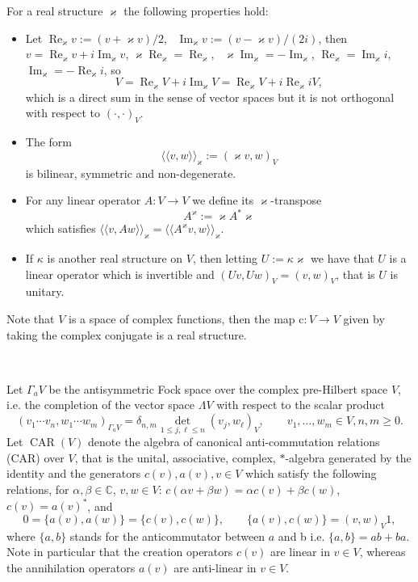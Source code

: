 \documentclass{article}
\newcommand{\assign}{:=}
\newcommand{\cdummy}{\cdot}
\newcommand{\llangle}{{\langle\!\langle}}
\newcommand{\rrangle}{{\rangle\!\rangle}}
\newcommand{\tmop}[1]{\ensuremath{\operatorname{#1}}}
\newenvironment{itemizedot}{\begin{itemize} \renewcommand{\labelitemi}{$\bullet$}\renewcommand{\labelitemii}{$\bullet$}\renewcommand{\labelitemiii}{$\bullet$}\renewcommand{\labelitemiv}{$\bullet$}}{\end{itemize}}
\begin{document}
For a real structure $\varkappa$ the following properties hold:
\begin{itemizedot}
  \item Let $\tmop{Re}_{\varkappa} v \assign (v + \varkappa v) / 2$, \
  $\tmop{Im}_{\varkappa} v \assign (v - \varkappa v) / (2 i)$, then $v =
  \tmop{Re}_{\varkappa} v + i \tmop{Im}_{\varkappa} v$, $\varkappa
  \tmop{Re}_{\varkappa} = \tmop{Re}_{\varkappa}$, \ $\varkappa
  \tmop{Im}_{\varkappa} = - \tmop{Im}_{\varkappa}$, $\tmop{Re}_{\varkappa} =
  \tmop{Im}_{\varkappa} i$, \ $\tmop{Im}_{\varkappa} = - \tmop{Re}_{\varkappa}
  i$, so
  \[ V = \tmop{Re}_{\varkappa} V + i \tmop{Im}_{\varkappa} V =
     \tmop{Re}_{\varkappa} V + i \tmop{Re}_{\varkappa} i V, \]
  which is a direct sum in the sense of vector spaces but it is not orthogonal
  with respect to $(\cdummy, \cdummy)_V$.
  
  \item The form
  \[ \llangle v, w \rrangle_{\varkappa} \assign (\varkappa v, w)_V \]
  is bilinear, symmetric and non-degenerate.
  
  \item For any linear operator $A : V \rightarrow V$ we define its
  $\varkappa$-transpose
  \[ A^{\varkappa} \assign \varkappa A^{\ast} \varkappa \]
  which satisfies $\llangle v, A w \rrangle_{\varkappa} = \llangle
  A^{\varkappa} v, w \rrangle_{\varkappa}$.
  
  \item If $\kappa$ is another real structure on $V$, then letting $U \assign
  \kappa \varkappa$ we have that $U$ is a linear operator which is invertible
  and $(U v, U w)_V = (v, w)_V$, that is $U$ is unitary.
\end{itemizedot}


Note that $V$ is a space of complex functions, then the map $\mathrm{c}: V
\rightarrow V$ given by taking the complex conjugate is a real structure.

\

Let $\Gamma_a V$ be the antisymmetric Fock space over the complex pre-Hilbert
space $V$, i.e. the completion of the vector space $\Lambda V$ with respect to
the scalar product
\[ (v_1 \cdots v_n, w_1 \cdots w_m)_{\Gamma_a V} = \delta_{n, m} \underset{1
   \leqslant j, \ell \leqslant n}{\det} (v_j, w_{\ell})_V, \qquad v_1, \ldots,
   w_m \in V, n, m \geqslant 0. \]
Let $\tmop{CAR} (V)$ denote the algebra of canonical anti-commutation
relations (CAR) over $V$, that is the unital, associative, complex,
$\ast$-algebra generated by the identity and the generators $c (v), a (v), v
\in V$ which satisfy the following relations, for $\alpha, \beta \in
\mathbb{C}$, $v, w \in V$: $c (\alpha v + \beta w) = \alpha c (v) + \beta c
(w)$, $c (v) = a (v)^{\ast}$, and
\[ 0 = \{ a (v), a (w) \} = \{ c (v), c (w) \}, \qquad \{ a (v), c (w) \} =
   (v, w)_V 1, \]
where $\{ a, b \}$ stands for the anticommutator between $a$ and b i.e. $\{ a,
b \} = a b + b a$. Note in particular that the creation operators $c (v)$ are
linear in $v \in V$, whereas the annihilation operators $a (v)$ are
anti-linear in $v \in V$.
\end{document}
